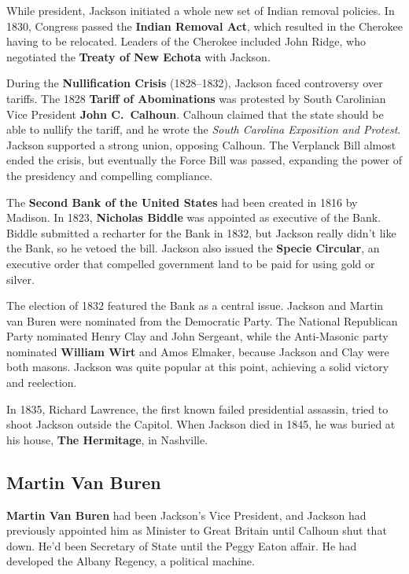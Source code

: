 While president, Jackson initiated a whole new set of Indian removal policies.
In 1830, Congress passed the \textbf{Indian Removal Act},
which resulted in the Cherokee having to be relocated.
Leaders of the Cherokee included John Ridge,
who negotiated the \textbf{Treaty of New Echota} with Jackson.

During the \textbf{Nullification Crisis} (1828--1832), Jackson faced controversy over tariffs.
The 1828 \textbf{Tariff of Abominations} was protested by South Carolinian Vice President \textbf{John C.\ Calhoun}.
Calhoun claimed that the state should be able to nullify the tariff,
and he wrote the \textit{South Carolina Exposition and Protest}.
Jackson supported a strong union, opposing Calhoun.
The Verplanck Bill almost ended the crisis,
but eventually the Force Bill was passed, expanding the power of the presidency and compelling compliance.

The \textbf{Second Bank of the United States} had been created in 1816 by Madison.
In 1823, \textbf{Nicholas Biddle} was appointed as executive of the Bank.
Biddle submitted a recharter for the Bank in 1832,
but Jackson really didn't like the Bank, so he vetoed the bill.
Jackson also issued the \textbf{Specie Circular},
an executive order that compelled government land to be paid for using gold or silver.

The election of 1832 featured the Bank as a central issue.
Jackson and Martin van Buren were nominated from the Democratic Party.
The National Republican Party nominated Henry Clay and John Sergeant,
while the Anti-Masonic party nominated \textbf{William Wirt} and Amos Elmaker,
because Jackson and Clay were both masons.
Jackson was quite popular at this point, achieving a solid victory and reelection.

In 1835, Richard Lawrence, the first known failed presidential assassin, tried to shoot Jackson outside the Capitol.
When Jackson died in 1845, he was buried at his house, \textbf{The Hermitage}, in Nashville.

\subsection*{Martin Van Buren}

\textbf{Martin Van Buren} had been Jackson's Vice President,
and Jackson had previously appointed him as Minister to Great Britain until Calhoun shut that down.
He'd been Secretary of State until the Peggy Eaton affair.
He had developed the Albany Regency, a political machine.

